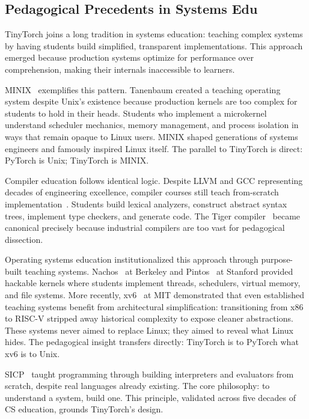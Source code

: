 \documentclass[10pt,twocolumn]{article}
\begin{document}
\subsection{Pedagogical Precedents in Systems Edu}

TinyTorch joins a long tradition in systems education: teaching complex systems by having students build simplified, transparent implementations. This approach emerged because production systems optimize for performance over comprehension, making their internals inaccessible to learners.

MINIX~\citep{tanenbaum1987os} exemplifies this pattern. Tanenbaum created a teaching operating system despite Unix's existence because production kernels are too complex for students to hold in their heads. Students who implement a microkernel understand scheduler mechanics, memory management, and process isolation in ways that remain opaque to Linux users. MINIX shaped generations of systems engineers and famously inspired Linux itself. The parallel to TinyTorch is direct: PyTorch is Unix; TinyTorch is MINIX.

Compiler education follows identical logic. Despite LLVM and GCC representing decades of engineering excellence, compiler courses still teach from-scratch implementation~\citep{aho2006compilers, appel2002}. Students build lexical analyzers, construct abstract syntax trees, implement type checkers, and generate code. The Tiger compiler~\citep{appel2002} became canonical precisely because industrial compilers are too vast for pedagogical dissection.

Operating systems education institutionalized this approach through purpose-built teaching systems. Nachos~\citep{christopher1993nachos} at Berkeley and Pintos~\citep{pfaff2009} at Stanford provided hackable kernels where students implement threads, schedulers, virtual memory, and file systems. More recently, xv6~\citep{kaashoek2023xv6} at MIT demonstrated that even established teaching systems benefit from architectural simplification: transitioning from x86 to RISC-V stripped away historical complexity to expose cleaner abstractions. These systems never aimed to replace Linux; they aimed to reveal what Linux hides. The pedagogical insight transfers directly: TinyTorch is to PyTorch what xv6 is to Unix.

SICP~\citep{abelson1996sicp} taught programming through building interpreters and evaluators from scratch, despite real languages already existing. The core philosophy: to understand a system, build one. This principle, validated across five decades of CS education, grounds TinyTorch's design.
\end{document}
